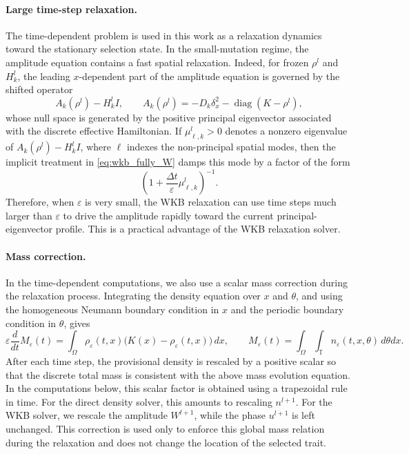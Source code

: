 \documentclass[11pt]{article}
\numberwithin{equation}{section}
\begin{document}
\paragraph{Large time-step relaxation.}
The time-dependent problem is used in this work as a relaxation dynamics
toward the stationary selection state. In the small-mutation regime, the
amplitude equation contains a fast spatial relaxation. Indeed, for frozen
$\rho^l$ and $H_k^l$, the leading $x$-dependent part of the amplitude equation
is governed by the shifted operator
$$
A_k(\rho^l)-H_k^l I,
\qquad
A_k(\rho^l)=-D_k\delta_x^2-\operatorname{diag}(K-\rho^l),
$$
whose null space is generated by the positive principal eigenvector associated
with the discrete effective Hamiltonian. If
$\mu_{\ell,k}^l>0$ denotes a nonzero eigenvalue of
$A_k(\rho^l)-H_k^l I$, where $\ell$ indexes the non-principal spatial modes,
then the implicit treatment in \eqref{eq:wkb_fully_W} damps this mode by a
factor of the form
$$
\left(1+\frac{\Delta t}{\varepsilon}\mu_{\ell,k}^l\right)^{-1}.
$$
Therefore, when $\varepsilon$ is very small, the WKB relaxation can use time
steps much larger than $\varepsilon$ to drive the amplitude rapidly toward the
current principal-eigenvector profile. This is a practical advantage of the WKB
relaxation solver.



\paragraph{Mass correction.}
In the time-dependent computations, we also use a scalar mass correction
during the relaxation process. Integrating the density equation over
\(x\) and \(\theta\), and using the homogeneous Neumann boundary condition
in \(x\) and the periodic boundary condition in \(\theta\), gives
\[
\varepsilon \frac{d}{dt} M_\varepsilon(t)
=
\int_\Omega
\rho_\varepsilon(t,x)
\bigl(K(x)-\rho_\varepsilon(t,x)\bigr)\,dx,
\qquad
M_\varepsilon(t)
=
\int_\Omega\int_{\mathbb T}
n_\varepsilon(t, x,\theta)\,d\theta dx .
\]
After each time step, the provisional density is rescaled by a positive scalar
so that the discrete total mass is consistent with the above mass evolution
equation. In the computations below, this scalar factor is obtained using a
trapezoidal rule in time. For the direct density solver, this amounts to
rescaling \(n^{l+1}\). For the WKB solver, we rescale the amplitude
\(W^{l+1}\), while the phase \(u^{l+1}\) is left unchanged. This correction is
used only to enforce this global mass relation during the relaxation and does not
change the location of the selected trait.
\end{document}
